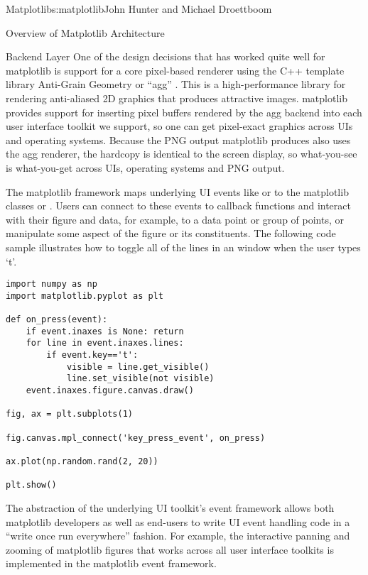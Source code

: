 \begin{aosachapter}{Matplotlib}{s:matplotlib}{John Hunter and Michael Droettboom}
\begin{aosasect1}{Overview of Matplotlib Architecture}
\begin{aosasect2}{Backend Layer}
One of the design decisions that has worked quite well for matplotlib
is support for a core pixel-based renderer using the C++ template
library Anti-Grain Geometry or ``agg'' \cite{bib:agg}.  This is a
high-performance library for rendering anti-aliased 2D graphics that
produces attractive images.  matplotlib provides support for inserting
pixel buffers rendered by the agg backend into each user interface
toolkit we support, so one can get pixel-exact graphics across UIs and
operating systems.  Because the PNG output matplotlib produces also
uses the agg renderer, the hardcopy is identical to the screen
display, so what-you-see is what-you-get across UIs, operating systems
and PNG output.

The matplotlib  framework maps underlying UI events like
 or \linebreak {} to the
matplotlib classes  or .
Users can connect to these events to callback functions and
interact with their figure and data, for example, to 
a data point or group of points, or manipulate some aspect of the 
figure or its constituents.  The following code sample illustrates
how to toggle all of the lines in an  window when the
user types `t'.


\begin{verbatim}
import numpy as np
import matplotlib.pyplot as plt

def on_press(event):
    if event.inaxes is None: return
    for line in event.inaxes.lines:
        if event.key=='t':
            visible = line.get_visible()
            line.set_visible(not visible)
    event.inaxes.figure.canvas.draw()

fig, ax = plt.subplots(1)

fig.canvas.mpl_connect('key_press_event', on_press)

ax.plot(np.random.rand(2, 20))

plt.show()
\end{verbatim}

The abstraction of the underlying UI toolkit's event framework allows
both matplotlib developers as well as end-users to write UI event
handling code in a ``write once run everywhere'' fashion. For example,
the interactive panning and zooming of matplotlib figures that works
across all user interface toolkits is implemented in the matplotlib
event framework.


\end{aosasect2}
\end{aosasect1}
\end{aosachapter}
